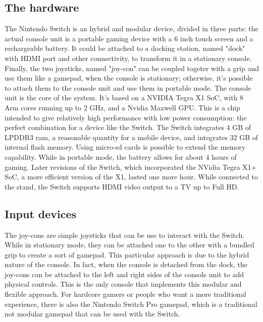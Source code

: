 \documentclass[a4paper,10pt]{book}
\begin{document}
 \subsection{ The hardware  }
  The Nintendo Switch is an hybrid and modular device, divided in three parts: the actual console unit is a portable gaming device with a 6 inch touch screen and a rechargeable battery. It could be attached to a docking station, named "dock" with HDMI port and other connectivity, to transform it in a stationary console. Finally, the two joysticks, named "joy-con" can be coupled togeter with a grip and use them like a gamepad, when the console is stationary; otherwise, it's possible to attach them to the console unit and use them in portable mode.  
  The console unit is the core of the system. It's based on a NVIDIA Tegra X1 SoC, with 8 Arm cores running up to 2 GHz, and a Nvidia Maxwell GPU.  
  This is a chip intended to give relatively high performance with low power consumption: the perfect combination for a device like the Switch.  
  The Switch integrates 4 GB of LPDDR3 ram, a reasonable quantity for a mobile device, and integrates 32 GB of internal flash memory. Using micro-sd cards is possible to extend the memory capability.  
  While in portable mode, the battery allows for about 4 hours of gaming. Later revisions of the Switch, which incorporated the NVidia Tegra X1+ SoC, a more efficient version of the X1, lasted one more hour.  
  While connected to the stand, the Switch supports HDMI video output to a TV up to Full HD.  
 \subsection{ Input devices  }
  The joy-cons are simple joysticks that can be use to interact with the Switch. While in stationary mode, they can be attached one to the other with a bundled grip to create a sort of gamepad. This particular approach is due to the hybrid nature of the console. In fact, when the console is detached from the dock, the joy-cons can be attached to the left and right sides of the console unit to add physical controls. This is the only console that implements this modular and flexible approach.  
  For hardcore gamers or people who want a more traditional experience, there is also the Nintendo Switch Pro gamepad, which is a traditional not modular gamepad that can be used with the Switch.  
\end{document}
